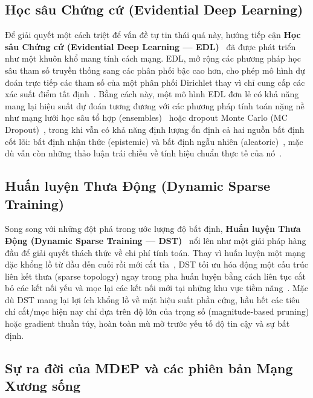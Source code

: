 \documentclass[11pt, a4paper]{article}
\begin{document}
\subsection{Học sâu Chứng cứ (Evidential Deep Learning)}

Để giải quyết một cách triệt để vấn đề tự tin thái quá này, hướng tiếp cận \textbf{Học sâu Chứng cứ (Evidential Deep Learning --- EDL)}~\cite{sensoy2018evidential, bao2021evidential} đã được phát triển như một khuôn khổ mang tính cách mạng. EDL, mở rộng các phương pháp học sâu tham số truyền thống sang các phân phối bậc cao hơn, cho phép mô hình dự đoán trực tiếp các tham số của một phân phối Dirichlet thay vì chỉ cung cấp các xác suất điểm tất định~\cite{sensoy2018evidential, malinin2018predictive}. Bằng cách này, một mô hình EDL đơn lẻ có khả năng mang lại hiệu suất dự đoán tương đương với các phương pháp tính toán nặng nề như mạng lưới học sâu tổ hợp (ensembles)~\cite{lakshminarayanan2017simple} hoặc dropout Monte Carlo (MC Dropout)~\cite{gal2016dropout}, trong khi vẫn có khả năng định lượng ổn định cả hai nguồn bất định cốt lõi: bất định nhận thức (epistemic) và bất định ngẫu nhiên (aleatoric)~\cite{jospin2022bayesian}, mặc dù vẫn còn những thảo luận trái chiều về tính hiệu chuẩn thực tế của nó~\cite{shen2024mirage}.

\subsection{Huấn luyện Thưa Động (Dynamic Sparse Training)}

Song song với những đột phá trong ước lượng độ bất định, \textbf{Huấn luyện Thưa Động (Dynamic Sparse Training --- DST)}~\cite{evci2020rigging, mocanu2018scalable} nổi lên như một giải pháp hàng đầu để giải quyết thách thức về chi phí tính toán. Thay vì huấn luyện một mạng đặc khổng lồ từ đầu đến cuối rồi mới cắt tỉa~\cite{han2016deep, frankle2019lottery}, DST tối ưu hóa động một cấu trúc liên kết thưa (sparse topology) ngay trong pha huấn luyện bằng cách liên tục cắt bỏ các kết nối yếu và mọc lại các kết nối mới tại những khu vực tiềm năng~\cite{hoefler2021sparsity}. Mặc dù DST mang lại lợi ích khổng lồ về mặt hiệu suất phần cứng, hầu hết các tiêu chí cắt/mọc hiện nay chỉ dựa trên độ lớn của trọng số (magnitude-based pruning) hoặc gradient thuần túy, hoàn toàn mù mờ trước yếu tố độ tin cậy và sự bất định.

\subsection{Sự ra đời của MDEP và các phiên bản Mạng Xương sống}
\end{document}
